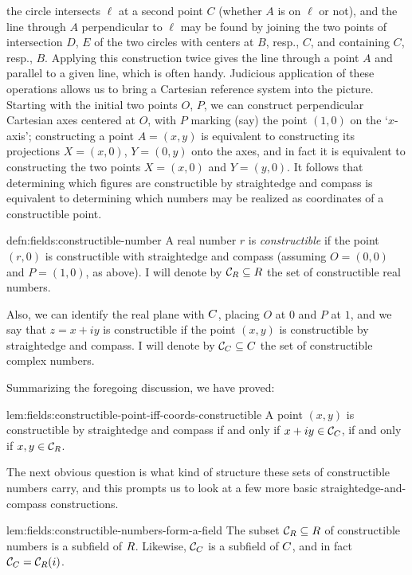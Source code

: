 the circle intersects $\ell$ at a second point $C$ (whether $A$ is on
$\ell$ or not), and the line through $A$ perpendicular to $\ell$ may
be found by joining the two points of intersection $D$, $E$ of the two
circles with centers at $B$, resp., $C$, and containing $C$, resp.,
$B$. Applying this construction twice gives the line through a point
$A$ and parallel to a given line, which is often handy.  Judicious
application of these operations allows us to bring a Cartesian
reference system into the picture. Starting with the initial two
points $O$, $P$, we can construct perpendicular Cartesian axes
centered at $O$, with $P$ marking (say) the point $(1,0)$ on the
`$x$-axis'; constructing a point $A = (x, y)$ is equivalent to
constructing its projections $X = (x,0)$, $Y = (0,y)$ onto the axes,
and in fact it is equivalent to constructing the two points
$X = (x,0)$ and $Y = (y,0)$. It follows that determining which figures
are constructible by straightedge and compass is equivalent to
determining which numbers may be realized as coordinates of a
constructible point.
\begin{defn}{}{defn:fields:constructible-number}
  A real number $r$ is \emph{constructible} if the point $(r, 0)$ is
  constructible with straightedge and compass (assuming $O = (0,0)$
  and $P = (1,0)$, as above). I will denote by
  $\mathcal{C}_{R} \subseteq R$ the set of constructible real
  numbers.

  Also, we can identify the real plane with $C$, placing $O$ at $0$
  and $P$ at $1$, and we say that $z = x + iy$ is constructible if the
  point $(x,y)$ is constructible by straightedge and compass. I will
  denote by $\mathcal{C}_{C} \subseteq C$ the set of constructible
  complex numbers.
\end{defn}
Summarizing the foregoing discussion, we have proved:
\begin{lem}{}{lem:fields:constructible-point-iff-coords-constructible}
  A point $(x,y)$ is constructible by straightedge and compass if and
  only if $x + iy \in \mathcal{C}_{C}$, if and only if
  $x, y \in \mathcal{C}_{R}$.
\end{lem}
The next obvious question is what kind of structure these sets of
constructible numbers carry, and this prompts us to look at a few more
basic straightedge-and-compass constructions.
\begin{lem}{}{lem:fields:constructible-numbers-form-a-field}
  The subset $\mathcal{C}_{R} \subseteq R$ of constructible numbers
  is a subfield of $R$. Likewise, $\mathcal{C}_{C}$ is a subfield of
  $C$, and in fact $\mathcal{C}_{C} = \mathcal{C}_{R}(i)$.
\end{lem}
